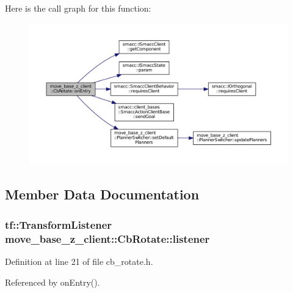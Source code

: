 Here is the call graph for this function\+:
\nopagebreak
\begin{figure}[H]
\begin{center}
\leavevmode
\includegraphics[width=350pt]{classmove__base__z__client_1_1CbRotate_a1528192ce89f2c1cbd9deffafecefb69_cgraph}
\end{center}
\end{figure}




\subsection{Member Data Documentation}
\subsubsection[{\texorpdfstring{listener}{listener}}]{\setlength{\rightskip}{0pt plus 5cm}tf\+::\+Transform\+Listener move\+\_\+base\+\_\+z\+\_\+client\+::\+Cb\+Rotate\+::listener}\hypertarget{classmove__base__z__client_1_1CbRotate_ad9afe4d39997d7b44fc304f81f519cc5}{}\label{classmove__base__z__client_1_1CbRotate_ad9afe4d39997d7b44fc304f81f519cc5}


Definition at line 21 of file cb\+\_\+rotate.\+h.



Referenced by on\+Entry().


